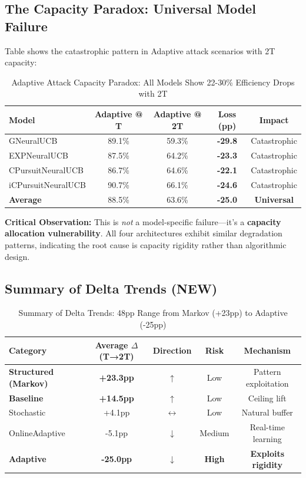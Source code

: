 \documentclass[11pt,a4paper]{article}
\newcommand{\critical}[1]{\textcolor{criticalcolor}{\textbf{#1}}}
\newcommand{\success}[1]{\textcolor{successcolor}{\textbf{#1}}}
\begin{document}
\subsection{The Capacity Paradox: Universal Model Failure}

Table shows the catastrophic pattern in Adaptive attack scenarios with 2T capacity:

\begin{table}[h]
\scriptsize
\centering
\begin{tabular}{lcccc}
\toprule
\textbf{Model} & \textbf{Adaptive @ T} & \textbf{Adaptive @ 2T} & \textbf{Loss (pp)} & \textbf{Impact} \\
\midrule
GNeuralUCB & 89.1\% & 59.3\% & \critical{-29.8} & Catastrophic \\
EXPNeuralUCB & 87.5\% & 64.2\% & \critical{-23.3} & Catastrophic \\
CPursuitNeuralUCB & 86.7\% & 64.6\% & \critical{-22.1} & Catastrophic \\
iCPursuitNeuralUCB & 90.7\% & 66.1\% & \critical{-24.6} & Catastrophic \\
\midrule
\textbf{Average} & 88.5\% & 63.6\% & \critical{-25.0} & \critical{Universal} \\
\bottomrule
\end{tabular}
\caption{Adaptive Attack Capacity Paradox: All Models Show 22-30\% Efficiency Drops with 2T}
\end{table}

\textbf{Critical Observation:} This is \textit{not} a model-specific failure—it's a \critical{capacity allocation vulnerability}. All four architectures exhibit similar degradation patterns, indicating the root cause is capacity rigidity rather than algorithmic design.

\subsection{Summary of Delta Trends (NEW)}

\begin{table}[h]
\scriptsize
\centering
\begin{tabular}{lcccc}
\toprule
\textbf{Category} & \textbf{Average $\Delta$(T→2T)} & \textbf{Direction} & \textbf{Risk} & \textbf{Mechanism} \\
\midrule
\success{Structured (Markov)} & \success{+23.3pp} & \success{$\uparrow$} & Low & Pattern exploitation \\
\success{Baseline} & \success{+14.5pp} & \success{$\uparrow$} & Low & Ceiling lift \\
Stochastic & +4.1pp & $\leftrightarrow$ & Low & Natural buffer \\
OnlineAdaptive & -5.1pp & $\downarrow$ & Medium & Real-time learning \\
\critical{Adaptive} & \critical{-25.0pp} & \critical{$\downarrow$} & \critical{High} & \critical{Exploits rigidity} \\
\bottomrule
\end{tabular}
\caption{Summary of Delta Trends: 48pp Range from Markov (+23pp) to Adaptive (-25pp)}
\end{table}
\end{document}
